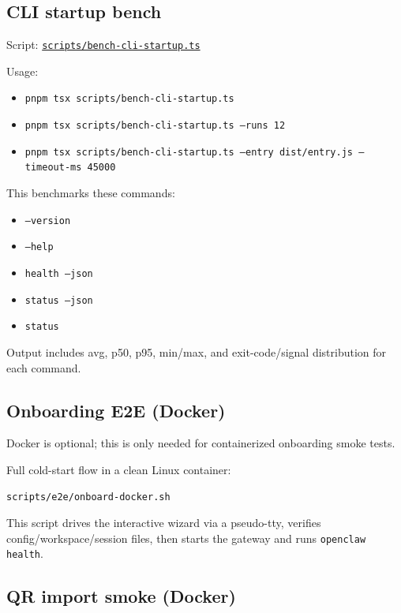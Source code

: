 \subsection{CLI startup bench}


Script: \href{https://github.com/openclaw/openclaw/blob/main/scripts/bench-cli-startup.ts}{\texttt{scripts/bench-cli-startup.ts}}

Usage:

\begin{itemize}
  \item \texttt{pnpm tsx scripts/bench-cli-startup.ts}
  \item \texttt{pnpm tsx scripts/bench-cli-startup.ts --runs 12}
  \item \texttt{pnpm tsx scripts/bench-cli-startup.ts --entry dist/entry.js --timeout-ms 45000}
\end{itemize}


This benchmarks these commands:

\begin{itemize}
  \item \texttt{--version}
  \item \texttt{--help}
  \item \texttt{health --json}
  \item \texttt{status --json}
  \item \texttt{status}
\end{itemize}


Output includes avg, p50, p95, min/max, and exit-code/signal distribution for each command.

\subsection{Onboarding E2E (Docker)}


Docker is optional; this is only needed for containerized onboarding smoke tests.

Full cold-start flow in a clean Linux container:

\begin{lstlisting}[language=bash]
scripts/e2e/onboard-docker.sh
\end{lstlisting}


This script drives the interactive wizard via a pseudo-tty, verifies config/workspace/session files, then starts the gateway and runs \texttt{openclaw health}.

\subsection{QR import smoke (Docker)}


